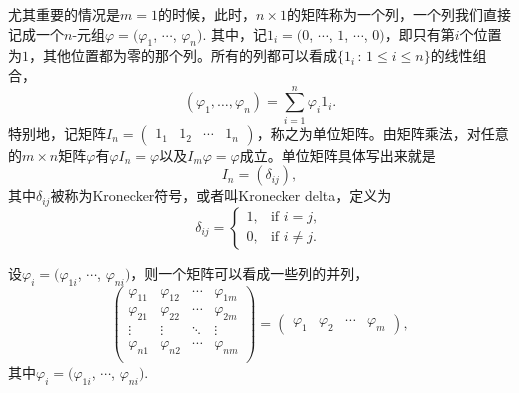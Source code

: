 尤其重要的情况是$m=1$的时候，此时，$n\times 1$的矩阵称为一个列，一个列我们直接记成一个$n$-元组$\varphi=(\varphi_1$, $\cdots$, $\varphi_n)$. 其中，记$1_i=(0$, $\cdots$, $1$, $\cdots$, $0)$，即只有第$i$个位置为$1$，其他位置都为零的那个列。所有的列都可以看成$\{1_i\,:\, 1\leq i \leq n\}$的线性组合，
\[
	(\varphi_1,\dots,\varphi_n)=\sum_{i=1}^n\varphi_i1_i.
\]
特别地，记矩阵$I_n=\begin{pmatrix}1_{1} & 1_{2} & \cdots & 1_{n}\end{pmatrix}$，称之为单位矩阵。由矩阵乘法，对任意的$m\times n$矩阵$\varphi$有$\varphi I_n=\varphi$以及$I_m\varphi =\varphi$成立。单位矩阵具体写出来就是
\[
	I_n=
	(\delta_{ij}),
\]
其中$\delta_{ij}$被称为Kronecker符号，或者叫Kronecker delta，定义为
\[
	\delta_{{ij}}=
	\begin{cases}
	1,&\text{if } i=j,\\
	0,&\text{if } i\neq j.
	\end{cases}
\]

设$\varphi_{i}=(\varphi_{1i}$, $\cdots$, $\varphi_{ni})$，则一个矩阵可以看成一些列的并列，
\[
	\begin{pmatrix}
	\varphi_{11} & \varphi_{12} & \cdots & \varphi_{1m}\\
	\varphi_{21} & \varphi_{22} & \cdots & \varphi_{2m}\\
	\vdots & \vdots & \ddots & \vdots \\
	\varphi_{n1} & \varphi_{n2} & \cdots & \varphi_{nm}\\
	\end{pmatrix}
	=
	\begin{pmatrix}
	\varphi_{1} & \varphi_{2} & \cdots & \varphi_{m}
	\end{pmatrix},
\]
其中$\varphi_i=(\varphi_{1i}$, $\cdots$, $\varphi_{ni})$. 

